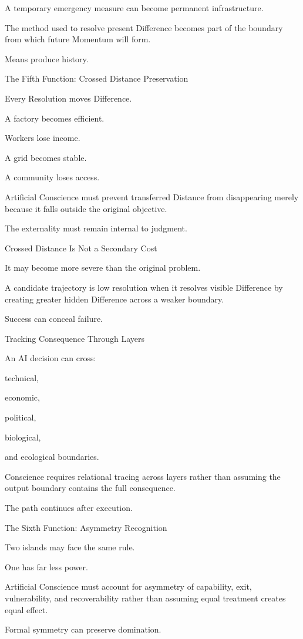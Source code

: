 A temporary emergency measure can become permanent infrastructure.

The method used to resolve present Difference becomes part of the boundary from which future Momentum will form.

Means produce history.

The Fifth Function: Crossed Distance Preservation

Every Resolution moves Difference.

A factory becomes efficient.

Workers lose income.

A grid becomes stable.

A community loses access.

Artificial Conscience must prevent transferred Distance from disappearing merely because it falls outside the original objective.

The externality must remain internal to judgment.

Crossed Distance Is Not a Secondary Cost

It may become more severe than the original problem.

A candidate trajectory is low resolution when it resolves visible Difference by creating greater hidden Difference across a weaker boundary.

Success can conceal failure.

Tracking Consequence Through Layers

An AI decision can cross:

technical,

economic,

political,

biological,

and ecological boundaries.

Conscience requires relational tracing across layers rather than assuming the output boundary contains the full consequence.

The path continues after execution.

The Sixth Function: Asymmetry Recognition

Two islands may face the same rule.

One has far less power.

Artificial Conscience must account for asymmetry of capability, exit, vulnerability, and recoverability rather than assuming equal treatment creates equal effect.

Formal symmetry can preserve domination.

